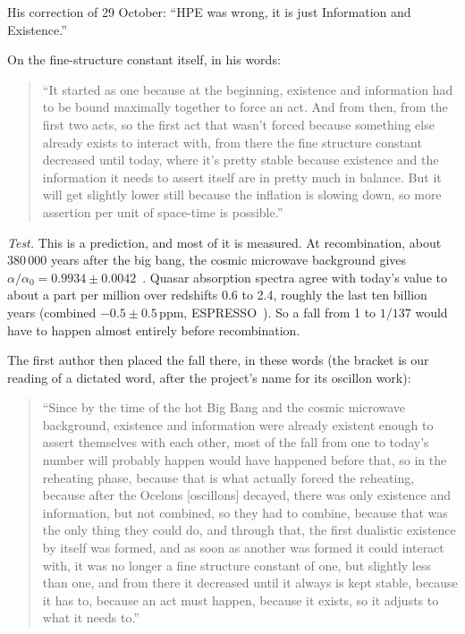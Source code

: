 \documentclass[11pt,a4paper]{article}
\theoremstyle{definition}
\theoremstyle{remark}
\begin{document}
\noindent His correction of 29 October: ``HPE was wrong, it is just Information and Existence.''

\noindent On the fine-structure constant itself, in his words:

\begin{quote}
``It started as one because at the beginning, existence and information had to be bound maximally together to force an act. And from
then, from the first two acts, so the first act that wasn't forced because something else already exists to interact with, from there the
fine structure constant decreased until today, where it's pretty stable because existence and the information it needs to assert itself
are in pretty much in balance. But it will get slightly lower still because the inflation is slowing down, so more assertion per unit of
space-time is possible.''
\end{quote}

\noindent\emph{Test.} This is a prediction, and most of it is measured. At recombination, about 380\,000 years after the big bang, the
cosmic microwave background gives $\alpha/\alpha_0=0.9934\pm0.0042$~\cite{planckxxiv}. Quasar absorption spectra agree with today's value to
about a part per million over redshifts 0.6 to 2.4, roughly the last ten billion years (combined $-0.5\pm0.5$\,ppm,
ESPRESSO~\cite{espresso}). So a fall from 1 to $1/137$ would have to happen almost entirely before recombination.

\noindent The first author then placed the fall there, in these words (the bracket is our reading of a dictated word, after the project's
name for its oscillon work):

\begin{quote}
``Since by the time of the hot Big Bang and the cosmic microwave background, existence and information were already existent enough to
assert themselves with each other, most of the fall from one to today's number will probably happen would have happened before that, so
in the reheating phase, because that is what actually forced the reheating, because after the Ocelons [oscillons] decayed, there was
only existence and information, but not combined, so they had to combine, because that was the only thing they could do, and through
that, the first dualistic existence by itself was formed, and as soon as another was formed it could interact with, it was no longer a
fine structure constant of one, but slightly less than one, and from there it decreased until it always is kept stable, because it has
to, because an act must happen, because it exists, so it adjusts to what it needs to.''
\end{quote}
\end{document}
